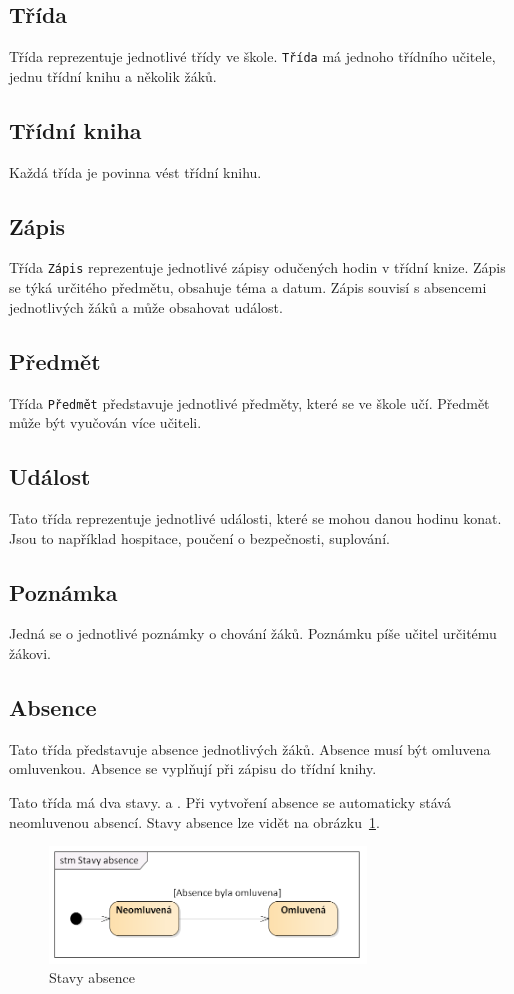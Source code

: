 \subsection{Třída}
Třída reprezentuje jednotlivé třídy ve škole. \texttt{Třída} má jednoho třídního učitele, jednu třídní knihu a několik žáků.
\subsection{Třídní kniha}
Každá třída je povinna vést třídní knihu. 
\subsection{Zápis}
Třída \texttt{Zápis} reprezentuje jednotlivé zápisy odučených hodin v třídní knize. Zápis se týká určitého předmětu, obsahuje téma a datum. Zápis souvisí s absencemi jednotlivých žáků a může obsahovat událost.
\subsection{Předmět}
Třída \texttt{Předmět} představuje jednotlivé předměty, které se ve škole učí. Předmět může být vyučován více učiteli.
\subsection{Událost}
Tato třída reprezentuje jednotlivé události, které se mohou danou hodinu konat. Jsou to například hospitace, poučení o bezpečnosti, suplování.
\subsection{Poznámka}
Jedná se o jednotlivé poznámky o chování žáků. Poznámku píše učitel určitému žákovi.
\subsection{Absence}
Tato třída představuje absence jednotlivých žáků. Absence musí být omluvena omluvenkou. Absence se vyplňují při zápisu do třídní knihy.

Tato třída má dva stavy.  a . Při vytvoření absence se automaticky stává neomluvenou absencí. Stavy absence lze vidět na obrázku~\ref{stavy_absence}.

\begin{figure}[h]
	\centering
	\includegraphics[width=0.75\textwidth]{images/Stavy_absence.png}
	\caption{Stavy absence}
	\label{stavy_absence}
\end{figure}

